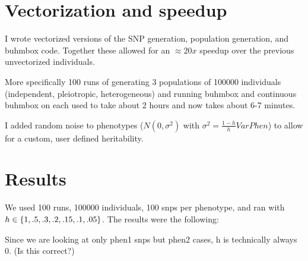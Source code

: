 \documentclass[11pt]{hw-template}
\begin{document}
\maketitle

\section*{Vectorization and speedup}

I wrote vectorized versions of the SNP generation, population generation, and buhmbox code. Together these allowed for an $\approx 20x$ speedup over the previous unvectorized individuals.

More specifically 100 runs of generating 3 populations of 100000 individuals (independent, pleiotropic, heterogeneous) and running buhmbox and continuous buhmbox on each used to take about 2 hours and now
takes about 6-7 minutes.




I added random noise to phenotypes ($N(0, \sigma^2)$ with $\sigma^2 = \frac{1-h}{h}VarPhen$) to allow for a custom, user defined heritability.

\section*{Results}
We used 100 runs, 100000 individuals, 100 snps per phenotype, and ran with $h \in \left\{1, .5, .3, .2, .15, .1, .05\right\}$. The results were the following:

\begin{table}[h!]
\caption{Independent Population} 
\end{table}
Since we are looking at only phen1 snps but phen2 cases, h is technically always 0. (Is this correct?)
\end{document}
